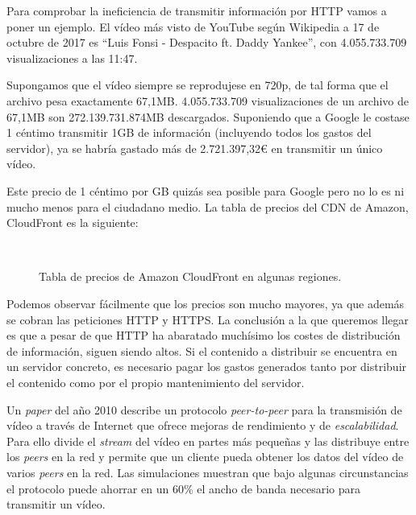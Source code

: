 \documentclass[12pt]{article} %
\begin{document}
Para comprobar la ineficiencia de transmitir información por HTTP vamos a poner un ejemplo. El vídeo más visto de YouTube según Wikipedia a 17 de octubre de 2017 es ``Luis Fonsi - Despacito ft. Daddy Yankee''\cite{most-viewed-yt}, con 4.055.733.709 visualizaciones a las 11:47.

Supongamos que el vídeo siempre se reprodujese en 720p, de tal forma que el archivo pesa exactamente 67,1MB. 4.055.733.709 visualizaciones de un archivo de 67,1MB son 272.139.731.874MB descargados. Suponiendo que a Google le costase 1 céntimo transmitir 1GB de información\cite{youtube-transmission-cost} (incluyendo todos los gastos del servidor), ya se habría gastado más de 2.721.397,32€ en transmitir un único vídeo.

Este precio de 1 céntimo por GB quizás sea posible para Google pero no lo es ni mucho menos para el ciudadano medio. La tabla de precios del CDN de Amazon, CloudFront es la siguiente\cite{cloudfront-prices}:

\begin{figure}[H]
	\centering
	\texttt{
	}
	\caption{Tabla de precios de Amazon CloudFront en algunas regiones.}
\end{figure}
\vspace{-.5cm}
Podemos observar fácilmente que los precios son mucho mayores, ya que además se cobran las peticiones HTTP y HTTPS. La conclusión a la que queremos llegar es que a pesar de que HTTP ha abaratado muchísimo los costes de distribución de información, siguen siendo altos. Si el contenido a distribuir se encuentra en un servidor concreto, es necesario pagar los gastos generados tanto por distribuir el contenido como por el propio mantenimiento del servidor.

Un \textit{paper} del año 2010\cite{p2p-vdn} describe un protocolo \textit{peer-to-peer} para la transmisión de vídeo a través de Internet que ofrece mejoras de rendimiento y de \textit{escalabilidad}. Para ello divide el \textit{stream} del vídeo en partes más pequeñas y las distribuye entre los \textit{peers} en la red y permite que un cliente pueda obtener los datos del vídeo de varios \textit{peers} en la red. Las simulaciones muestran que bajo algunas circunstancias el protocolo puede ahorrar en un 60\% el ancho de banda necesario para transmitir un vídeo.
\end{document}
